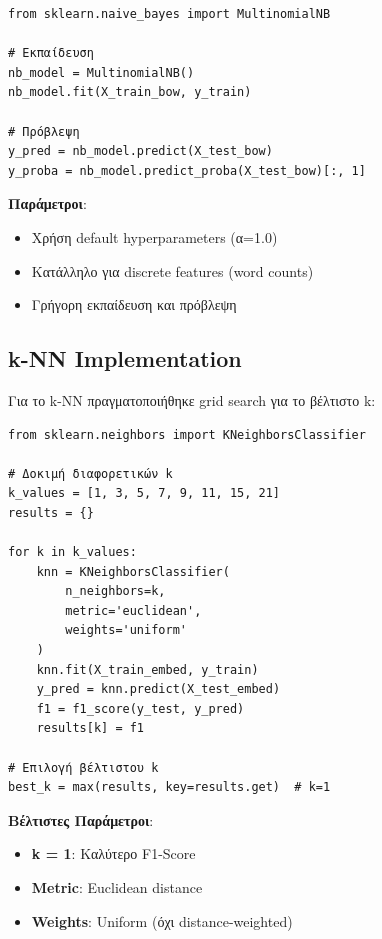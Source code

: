 \documentclass[12pt,a4paper,twoside]{book}
\begin{document}
\begin{tcolorbox}[myCustomStyle={Naive Bayes Training}]
    \begin{lstlisting}[style=myPythonStyle]
from sklearn.naive_bayes import MultinomialNB

# Εκπαίδευση
nb_model = MultinomialNB()
nb_model.fit(X_train_bow, y_train)

# Πρόβλεψη
y_pred = nb_model.predict(X_test_bow)
y_proba = nb_model.predict_proba(X_test_bow)[:, 1]
\end{lstlisting}
\end{tcolorbox}

\textbf{Παράμετροι}:
\begin{itemize}
    \item Χρήση default hyperparameters (α=1.0)
    \item Κατάλληλο για discrete features (word counts)
    \item Γρήγορη εκπαίδευση και πρόβλεψη
\end{itemize}

\subsection{k-NN Implementation}

Για το k-NN πραγματοποιήθηκε grid search για το βέλτιστο k:

\begin{tcolorbox}[myCustomStyle={k-NN Grid Search}]
    \begin{lstlisting}[style=myPythonStyle]
from sklearn.neighbors import KNeighborsClassifier

# Δοκιμή διαφορετικών k
k_values = [1, 3, 5, 7, 9, 11, 15, 21]
results = {}

for k in k_values:
    knn = KNeighborsClassifier(
        n_neighbors=k,
        metric='euclidean',
        weights='uniform'
    )
    knn.fit(X_train_embed, y_train)
    y_pred = knn.predict(X_test_embed)
    f1 = f1_score(y_test, y_pred)
    results[k] = f1

# Επιλογή βέλτιστου k
best_k = max(results, key=results.get)  # k=1
\end{lstlisting}
\end{tcolorbox}

\textbf{Βέλτιστες Παράμετροι}:
\begin{itemize}
    \item \textbf{k = 1}: Καλύτερο F1-Score
    \item \textbf{Metric}: Euclidean distance
    \item \textbf{Weights}: Uniform (όχι distance-weighted)
\end{itemize}
\end{document}
